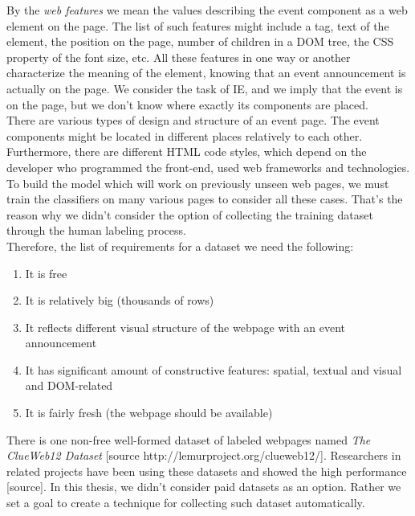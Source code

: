 By the \textit{web features} we mean the values describing the event component as a web element on the page. The list of such features might include a tag, text of the element, the position on the page, number of children in a DOM tree, the CSS property of the font size, etc. All these features in one way or another characterize the meaning of the element, knowing that an event announcement is actually on the page. We consider the task of IE, and we imply that the event is on the page, but we don't know where exactly its components are placed.\\

There are various types of design and structure of an event page. The event components might be located in different places relatively to each other. Furthermore, there are different HTML code styles, which depend on the developer who programmed the front-end, used web frameworks and technologies. To build the model which will work on previously unseen web pages, we must train the classifiers on many various pages to consider all these cases. That's the reason why we didn't consider the option of collecting the training dataset through the human labeling process.\\

Therefore, the list of requirements for a dataset we need the following: 

\begin{enumerate}
    \item It is free
    \item It is relatively big (thousands of rows)
    \item It reflects different visual structure of the webpage with an event announcement
    \item It has significant amount of constructive features: spatial, textual and visual and DOM-related
    \item It is fairly fresh (the webpage should be available)
\end{enumerate}

There is one non-free well-formed dataset of labeled webpages named \textit{The ClueWeb12 Dataset} [source http://lemurproject.org/clueweb12/]. Researchers in related projects have been using these datasets and showed the high performance [source]. In this thesis, we didn't consider paid datasets as an option. Rather we set a goal to create a technique for collecting such dataset automatically.\\

